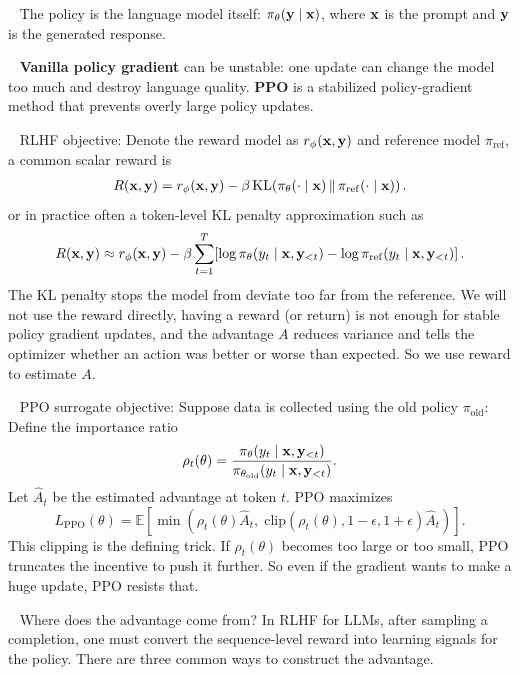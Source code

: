 \documentclass[11pt]{article}  %
\begin{document}
\textbullet~ The policy is the language model itself: $\pi_\theta(\mathbf{y} \mid \mathbf{x})$, where $\mathbf{x}$ is the prompt and $\mathbf{y}$ is the generated response.

\textbullet~ \textbf{Vanilla policy gradient} can be unstable: one update can change the model too much and destroy language quality. 
\textbf{PPO} is a stabilized policy-gradient method that prevents overly large policy updates.

\textbullet~ RLHF objective: Denote the reward model as $r_\phi(\mathbf{x}, \mathbf{y})$ and reference model $\pi_{\text{ref}}$, a common scalar reward is 
\begin{align*}
  R(\mathbf{x},\mathbf{y})=r_{\phi}(\mathbf{x},\mathbf{y})-\beta\,\mathrm{KL}\!\left(\pi_{\theta}(\cdot\mid\mathbf{x})\,\|\,\pi_{\mathrm{ref}}(\cdot\mid\mathbf{x})\right).
\end{align*}
or in practice often a token-level KL penalty approximation such as
\begin{align*}
  R(\mathbf{x},\mathbf{y})\approx r_{\phi}(\mathbf{x},\mathbf{y})-\beta\sum_{t=1}^{T}\!\left[\log \pi_{\theta}(y_t\mid \mathbf{x},\mathbf{y}_{<t})-\log \pi_{\mathrm{ref}}(y_t\mid \mathbf{x},\mathbf{y}_{<t})\right].
\end{align*}
The KL penalty stops the model from deviate too far from the reference.
We will not use the reward directly, having a reward (or return) is not enough for stable policy gradient updates, and the advantage $A$ reduces variance and tells the optimizer whether an action was better or worse than expected.
So we use reward to estimate $A$.

\textbullet~ PPO surrogate objective: Suppose data is collected using the old policy $\pi_{\text{old}}$: Define the importance ratio
\begin{align*}
  \rho_t(\theta)=\frac{\pi_{\theta}(y_t\mid \mathbf{x},\mathbf{y}_{<t})}{\pi_{\theta_{\text{old}}}(y_t\mid \mathbf{x},\mathbf{y}_{<t})}.
\end{align*}
Let $\hat{A}_t$ be the estimated advantage at token $t$. PPO maximizes
\[
  L_{\mathrm{PPO}}(\theta)=\mathbb{E}\left[\min\left(\rho_t(\theta)\hat{A}_t,\;\mathrm{clip}\left(\rho_t(\theta),1-\epsilon,1+\epsilon\right)\hat{A}_t\right)\right].
\]
This clipping is the defining trick.
If $\rho_t(\theta)$ becomes too large or too small, PPO truncates the incentive to push it further.
So even if the gradient wants to make a huge update, PPO resists that.

\textbullet~ Where does the advantage come from? In RLHF for LLMs, after sampling a completion, one must convert the sequence-level reward into learning signals for the policy. There are three common ways to construct the advantage.
\end{document}
